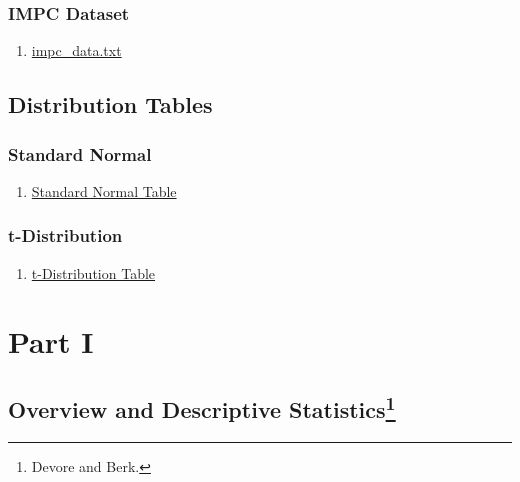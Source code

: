 \documentclass[]{book}
\providecommand{\tightlist}{%
  \setlength{\itemsep}{0pt}\setlength{\parskip}{0pt}}
\let\rmarkdownfootnote\footnote%
\def\footnote{\protect\rmarkdownfootnote}
\providecommand{\tightlist}{%
  \setlength{\itemsep}{0pt}\setlength{\parskip}{0pt}}
\theoremstyle{definition}
\theoremstyle{definition}
\theoremstyle{definition}
\theoremstyle{remark}
\begin{document}
\section{IMPC Dataset}\label{impc-dataset}

\begin{enumerate}
\def\labelenumi{\arabic{enumi}.}
\tightlist
\item
  \href{https://github.com/sahirbhatnagar/MATH697/blob/master/images/impc_data.txt}{impc\_data.txt}
\end{enumerate}

\chapter*{Distribution Tables}\label{distribution-tables}

\section{Standard Normal}\label{standard-normal}

\begin{enumerate}
\def\labelenumi{\arabic{enumi}.}
\tightlist
\item
  \href{https://github.com/sahirbhatnagar/MATH697/blob/master/images/Standard_Normal_Table.pdf}{Standard
  Normal Table}
\end{enumerate}

\section{t-Distribution}\label{t-distribution}

\begin{enumerate}
\def\labelenumi{\arabic{enumi}.}
\tightlist
\item
  \href{https://github.com/sahirbhatnagar/MATH697/blob/master/images/t_Table.pdf}{t-Distribution
  Table}
\end{enumerate}

\part{Part I}\label{part-part-i}

\chapter[Overview and Descriptive Statistics]{\texorpdfstring{Overview
and Descriptive Statistics\footnote{Devore and Berk.}}{Overview and Descriptive Statistics}}\label{intro}
\end{document}
